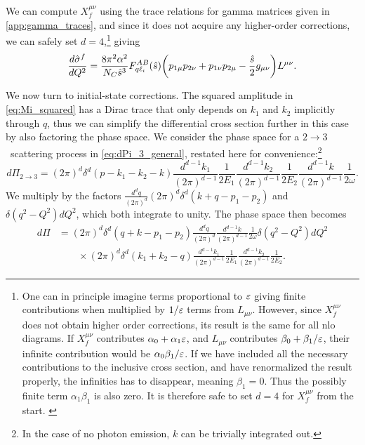 We can compute $X_f^{\mu\nu}$ using the trace relations for gamma matrices given in \cref{app:gamma_traces}, and since it does not acquire any higher-order corrections, we can safely set $d=4$,\footnote{
    One can in principle imagine terms proportional to $\varepsilon$ giving finite contributions when multiplied by $1/\varepsilon$ terms from $L_{\mu\nu}$.
    However, since $X_f^{\mu\nu}$ does not obtain higher order corrections, its result is the same for all \gls{nlo} diagrams.
    If $X_f^{\mu\nu}$ contributes $\alpha_0 + \alpha_1\varepsilon$, and $L_{\mu\nu}$ contributes $\beta_0 + \beta_1/\varepsilon$, their infinite contribution would be $\alpha_0\beta_1/\varepsilon$. If we have included all the necessary contributions to the inclusive cross section, and have renormalized the result properly, the infinities has to disappear, meaning $\beta_1=0$. Thus the possibly finite term $\alpha_1\beta_1$ is also zero. It is therefore safe to set $d=4$ for $X_f^{\mu\nu}$ from the start.
    \label{foot:d=4_argument}
} giving
\begin{equation}
    \frac{d\hat{\sigma}^f}{dQ^2} = \frac{8\pi^2\alpha^2}{N_C\hat{s}^3}F_{q\ell_i}^{AB}(\hat{s}) \biggl(p_{1\mu} p_{2\nu} + p_{1\nu} p_{2\mu} - \frac{\hat{s}}{2}g_{\mu\nu} \biggr) L^{\mu\nu}.
    \label{eq:dsigmaf_tensor}
\end{equation}

We now turn to initial-state corrections. The squared amplitude in \cref{eq:Mi_squared} has a Dirac trace that only depends on $k_1$ and $k_2$ implicitly through $q$, thus we can simplify the differential cross section further in this case by also factoring the phase space.
We consider the phase space for a $2\to3$~scattering process in \cref{eq:dPi_3_general}, restated here for convenience:\footnote{In the case of no photon emission, $k$ can be trivially integrated out.}
\begin{equation}
    d\Pi_{2\to 3} = (2\pi)^d \delta^d(p-k_1-k_2-k) 
    \frac{d^{d-1}k_1}{(2\pi)^{d-1}}\frac{1}{2E_1}
    \frac{d^{d-1}k_2}{(2\pi)^{d-1}}\frac{1}{2E_2}
    \frac{d^{d-1}k}{(2\pi)^{d-1}}\frac{1}{2\omega}.
\end{equation}
We multiply by the factors $\frac{d^d q}{(2\pi)^d} (2\pi)^d \delta^d(k+q-p_1-p_2)$ and $\delta(q^2-Q^2)dQ^2$, which both integrate to unity. The phase space then becomes
\begin{equation}
\begin{split}
    d\Pi &= (2\pi)^d \delta^d(q+k-p_1-p_2) \frac{d^dq}{(2\pi)^d}\frac{d^{d-1}k}{(2\pi)^{d-1}}\frac{1}{2\omega} \delta(q^2-Q^2)dQ^2
    \\ &\qquad \times
    (2\pi)^d \delta^d(k_1+k_2-q) \frac{d^{d-1}k_1}{(2\pi)^{d-1}}\frac{1}{2E_1}\frac{d^{d-1}k_2}{(2\pi)^{d-1}}\frac{1}{2E_2}.
\end{split}
\end{equation}

